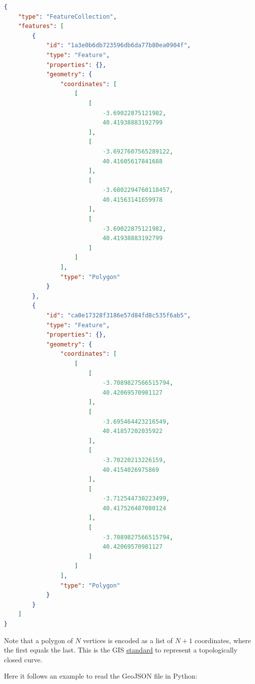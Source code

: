 \begin{lstlisting}[language=json,firstnumber=1]
{
    "type": "FeatureCollection",
    "features": [
        {
            "id": "1a3e0b6db723596db6da77b80ea0904f",
            "type": "Feature",
            "properties": {},
            "geometry": {
                "coordinates": [
                    [
                        [
                            -3.69022875121982,
                            40.41938883192799
                        ],
                        [
                            -3.6927607565289122,
                            40.41605617841688
                        ],
                        [
                            -3.6802294760118457,
                            40.41563141659978
                        ],
                        [
                            -3.69022875121982,
                            40.41938883192799
                        ]
                    ]
                ],
                "type": "Polygon"
            }
        },
        {
            "id": "ca0e17328f3186e57d84fd8c535f6ab5",
            "type": "Feature",
            "properties": {},
            "geometry": {
                "coordinates": [
                    [
                        [
                            -3.7089827566515794,
                            40.42069570981127
                        ],
                        [
                            -3.695464423216549,
                            40.41857202035922
                        ],
                        [
                            -3.70220213226159,
                            40.4154026975869
                        ],
                        [
                            -3.712544730223499,
                            40.417526487080124
                        ],
                        [
                            -3.7089827566515794,
                            40.42069570981127
                        ]
                    ]
                ],
                "type": "Polygon"
            }
        }
    ]
}
\end{lstlisting}

Note that a polygon of $N$ vertices is encoded as a list of $N+1$ coordinates, where the first equals the last. This is the GIS \href{https://www.ogc.org/standard/sfa/}{standard} to represent a topologically closed curve.

Here it follows an example to read the GeoJSON file in Python:

